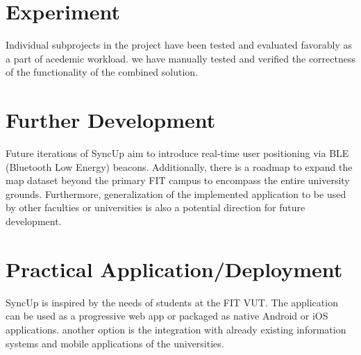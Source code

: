 \documentclass[12pt,a4paper]{article}
\begin{document}
\section*{Experiment}
Individual subprojects in the project have been tested and evaluated favorably as a part of acedemic workload. we have manually tested and verified the correctness of the functionality of the combined solution.

\section*{Further Development}
Future iterations of SyncUp aim to introduce real-time user positioning via BLE (Bluetooth Low Energy) beacons. Additionally, there is a roadmap to expand the map dataset beyond the primary FIT campus to encompass the entire university grounds. Furthermore, generalization of the implemented application to be used by other faculties or universities is also a potential direction for future development.

\section*{Practical Application/Deployment}
SyncUp is inspired by the needs of students at the FIT VUT. The application can be used as a progressive web app or packaged as native Android or iOS applications. another option is the integration with already existing information systems and mobile applications of the universities.
\end{document}
